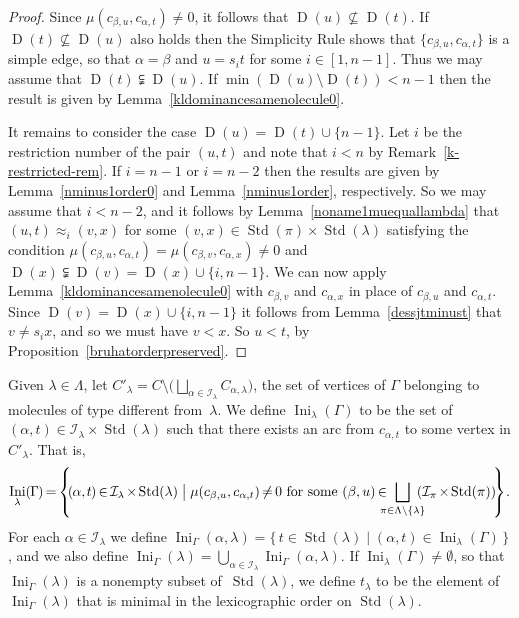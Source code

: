 \documentclass[ALCO,ThmDefs,Unicode,epreuves]{cedram}
\DeclareMathOperator{\Ini}{Ini}
\DeclareMathOperator{\STD}{Std}
\DeclareMathOperator{\D}{D}
\newcommand*{\mk}{\mkern -1mu}
\newcommand*{\Mk}{\mkern -2mu}
\begin{document}
\begin{proof}
Since $\mu(c_{\beta,u},c_{\alpha,t}) \neq 0$, it follows that
$\D(u)\nsubseteq\D(t)$. If $\D(t)\nsubseteq\D(u)$ also holds then the
Simplicity Rule
shows that
$\{c_{\beta,u},c_{\alpha,t}\}$ is a simple edge, so that $\alpha=\beta$ and
$u=s_i t$ for some $i\in[1,n-1]$. Thus we may assume that $\D(t)\subsetneqq\D(u)$.
If $\min(\D(u)\setminus\D(t))<n-1$ then
the result is given by Lemma~\ref{kldominancesamenolecule0}.

It remains to consider the case $\D(u)=\D(t)\cup\{n-1\}$. Let $i$ be the restriction
number of the pair $(u,t)$ and note that $i<n$ by Remark~\ref{k-restrricted-rem}.
If $i=n-1$ or $i=n-2$ then the results are given
by Lemma~\ref{nminus1order0} and Lemma~\ref{nminus1order}, respectively. So we may assume that
$i<n-2$, and it follows by Lemma~\ref{noname1muequallambda} that
$(u,t)\approx_i (v,x)$ for some $(v,x)\in\STD(\pi)\times\STD(\lambda)$ satisfying
the condition $\mu(c_{\beta,u},c_{\alpha,t}) = \mu(c_{\beta,v},c_{\alpha,x}) \neq 0$
and $\D(x)\subsetneqq\D(v)=\D(x)\cup\{i,n-1\}$. We can now apply
Lemma~\ref{kldominancesamenolecule0} with $c_{\beta,v}$ and $c_{\alpha,x}$ in place
of $c_{\beta,u}$ and $c_{\alpha,t}$. Since $\D(v)=\D(x)\cup\{i,n-1\}$ it follows
from Lemma~\ref{dessjtminust} that $v\ne s_ix$, and so we must have $v<x$.
So $u<t$, by Proposition~\ref{bruhatorderpreserved}.
\end{proof}

\begin{nota}\label{inidef}
Given $\lambda\in\Lambda$, let $C'_\lambda=
C\setminus\bigl(\bigsqcup_{\alpha\in\mathcal{I}_{\lambda}}C_{\alpha,\lambda}\bigr)$,
the set of vertices of $\Gamma$ belonging to molecules of type different
from~$\lambda$. We define $\Ini_{\lambda}(\Gamma)$ to be the set of
$(\alpha,t)\in\mathcal{I}_{\lambda}\times\STD(\lambda)$ such that there exists
an arc from $c_{\alpha,t}$ to some vertex in $C'_\lambda$. That is,
\[
\Ini_{\lambda}(\mk \Gamma \mk )\Mk = \Mk 
\left\{\Mk \Mk (\mk \alpha,\mk t\mk )\Mk \in\Mk \mathcal{I}_{\lambda}\Mk \times\Mk \STD(\lambda)\bigm|
\mu(c_{\beta,u},c_{\alpha,t})\Mk \neq\Mk 0 \text{ for some } (\beta,u)\Mk \in\Mk \!\!\!\!
\bigsqcup_{\pi\in\Lambda\setminus\{\lambda\}}\Mk \!\!\!
(\mathcal{I}_{\pi}\Mk \times\Mk \STD(\pi))\Mk \Mk \right\}\Mk .
\]
For each $\alpha\in\mathcal{I}_\lambda$ we define
$\Ini_\Gamma(\alpha,\lambda)=\{\,t\in\STD(\lambda)\mid(\alpha,t)\in\Ini_{\lambda}(\Gamma)\,\}$,
and we also define
$\Ini_\Gamma(\lambda)=\bigcup_{\alpha\in\mathcal{I}_\lambda}\Ini_\Gamma(\alpha,\lambda)$.
If $\Ini_{\lambda}(\Gamma)\neq\emptyset$, so that
$\Ini_\Gamma(\lambda)$ is a nonempty subset of~$\STD(\lambda)$, we define $t_\lambda$ to
be the element of $\Ini_\Gamma(\lambda)$ that is minimal in the lexicographic order
on $\STD(\lambda)$.
\end{nota}
\end{document}
